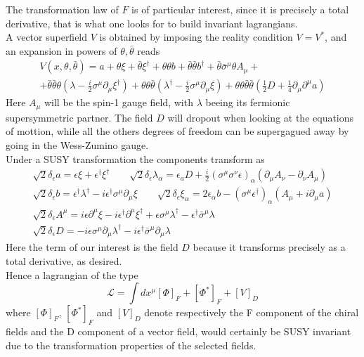 \documentclass[12pt]{article}
\begin{document}
The transformation law of $F$ is of particular interest, since it is precisely a total derivative, that is what one looks for to build invariant lagrangians. \\
\vspace{15pt}
A vector superfield $V$ is obtained by imposing the reality condition $V=V^*$, and an expansion in powers of $\theta, \bar\theta$ reads
\begin{gather*}
  V\left(x, \theta, \bar\theta\right) = a+\theta \xi+\bar\theta \xi^{\dagger} +\theta \theta b+\bar\theta \bar\theta b^{\dagger}+\bar\theta \bar{\sigma}^{\mu} \theta A_{\mu}+ \\ 
                + \bar\theta \bar\theta \theta\left(\lambda-\frac{i}{2} \sigma^{\mu} \partial_{\mu} \xi^{\dagger}\right)
                +\theta \theta \bar\theta\left(\lambda^{\dagger}-\frac{i}{2} \sigma^{\mu} \partial_{\mu} \xi\right)+\theta \theta \bar\theta \bar\theta \left(\frac{1}{2} D+\frac{1}{4} \partial_{\mu} \partial^{\mu} a\right)
\end{gather*}
Here $A_\mu$ will be the spin-1 gauge field, with $\lambda$ beeing its fermionic supersymmetric partner. The field $D$ will dropout when looking at the equations of mottion, while all the others degrees of freedom can be supergagued away by going in the Wess-Zumino gauge. \\
Under a SUSY transformation the components transform as 
\begin{gather*}
  \sqrt{2} \delta_{\epsilon} a =\epsilon \xi+\epsilon^{\dagger} \xi^{\dagger} \qquad 
  \sqrt{2} \delta_{\epsilon} \lambda_{\alpha} =\epsilon_{a} D+\frac{i}{2}\left(\sigma^{\mu} \sigma^{\nu} \epsilon\right)_{\alpha}\left(\partial_{\mu} A_{\nu}-\partial_{\nu} A_{\mu}\right) \\
  \sqrt{2} \delta_{\epsilon} b =\epsilon^{\dagger} \lambda^{\dagger}-i \epsilon^{\dagger} \sigma^{\mu} \partial_{\mu} \xi \qquad
  \sqrt{2} \delta_{\epsilon} \xi_{\alpha} =2 \epsilon_{\alpha} b-\left(\sigma^{\mu} \epsilon^{\dagger}\right)_{\alpha}\left(A_{\mu}+i \partial_{\mu} a\right) \\
  \sqrt{2} \delta_{\epsilon} A^{\mu} =i \epsilon \partial^{\mu} \xi-i \epsilon^{\dagger} \partial^{\mu} \xi^{\dagger}+\epsilon \sigma^{\mu} \lambda^{\dagger}-\epsilon^{\dagger} \bar{\sigma}^{\mu} \lambda \\
  \boxed{\sqrt{2} \delta_{\epsilon} D =-i \epsilon \sigma^{\mu} \partial_{\mu} \lambda^{\dagger}-i \epsilon^{\dagger} \bar{\sigma}^{\mu} \partial_{\mu} \lambda}
\end{gather*}
Here the term of our interest is the field $D$ because it transforms precisely as a total derivative, as desired. \\
Hence a lagrangian of the type 
\begin{equation*}
  \mathcal{L} = \int dx^\mu \left[\Phi\right]_F + \left[\Phi^*\right]_F + \left[V\right]_D
\end{equation*}
where $\left[\Phi\right]_F$, $\left[\Phi^*\right]_F$ and $\left[V\right]_D$ denote respectively the F component of the chiral fields and the D component of a vector field, would certainly be SUSY invariant due to the transformation properties of the selected fields. 
\end{document}
